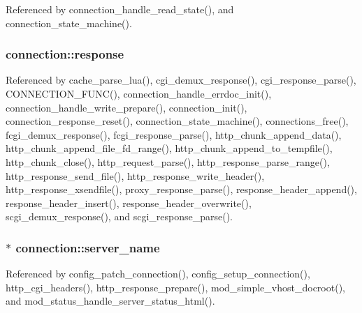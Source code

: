 Referenced by connection\-\_\-handle\-\_\-read\-\_\-state(), and connection\-\_\-state\-\_\-machine().

\hypertarget{structconnection_abe43f9dc2787128011e6510fe4673081}{
\subsubsection[{response}]{ connection\-::response}}\label{structconnection_abe43f9dc2787128011e6510fe4673081}


Referenced by cache\-\_\-parse\-\_\-lua(), cgi\-\_\-demux\-\_\-response(), cgi\-\_\-response\-\_\-parse(), C\-O\-N\-N\-E\-C\-T\-I\-O\-N\-\_\-\-F\-U\-N\-C(), connection\-\_\-handle\-\_\-errdoc\-\_\-init(), connection\-\_\-handle\-\_\-write\-\_\-prepare(), connection\-\_\-init(), connection\-\_\-response\-\_\-reset(), connection\-\_\-state\-\_\-machine(), connections\-\_\-free(), fcgi\-\_\-demux\-\_\-response(), fcgi\-\_\-response\-\_\-parse(), http\-\_\-chunk\-\_\-append\-\_\-data(), http\-\_\-chunk\-\_\-append\-\_\-file\-\_\-fd\-\_\-range(), http\-\_\-chunk\-\_\-append\-\_\-to\-\_\-tempfile(), http\-\_\-chunk\-\_\-close(), http\-\_\-request\-\_\-parse(), http\-\_\-response\-\_\-parse\-\_\-range(), http\-\_\-response\-\_\-send\-\_\-file(), http\-\_\-response\-\_\-write\-\_\-header(), http\-\_\-response\-\_\-xsendfile(), proxy\-\_\-response\-\_\-parse(), response\-\_\-header\-\_\-append(), response\-\_\-header\-\_\-insert(), response\-\_\-header\-\_\-overwrite(), scgi\-\_\-demux\-\_\-response(), and scgi\-\_\-response\-\_\-parse().

\hypertarget{structconnection_a1733a3bc86e073fd98e2dac8e2c7ed0f}{
\subsubsection[{server\-\_\-name}]{$\ast$ connection\-::server\-\_\-name}}\label{structconnection_a1733a3bc86e073fd98e2dac8e2c7ed0f}


Referenced by config\-\_\-patch\-\_\-connection(), config\-\_\-setup\-\_\-connection(), http\-\_\-cgi\-\_\-headers(), http\-\_\-response\-\_\-prepare(), mod\-\_\-simple\-\_\-vhost\-\_\-docroot(), and mod\-\_\-status\-\_\-handle\-\_\-server\-\_\-status\-\_\-html().

